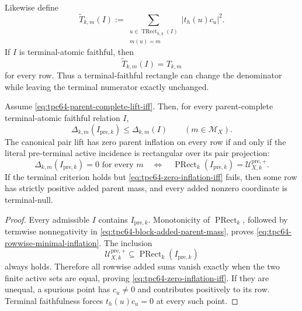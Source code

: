 Likewise define
\begin{equation}
 \widetilde T_{k,m}(I)
 :=
 \sum_{\substack{
 u\in\operatorname{TRect}_{h,k}(I)\\m(u)=m}}
 |t_h(u)c_u|^2.
 \label{eq:tpc64-rectangular-terminal-weight}
\end{equation}
If \(I\) is terminal-atomic faithful, then
\begin{equation}
 \boxed{\widetilde T_{k,m}(I)=T_{k,m}}
 \label{eq:tpc64-block-terminal-preservation}
\end{equation}
for every row.  Thus a terminal-faithful rectangle can change the
denominator while leaving the terminal numerator exactly unchanged.

\begin{theorem}
\label{thm:tpc64-minimal-parent-inflation}
Assume \eqref{eq:tpc64-parent-complete-lift-iff}.  Then, for every
parent-complete terminal-atomic faithful relation \(I\),
\begin{equation}
 \Delta_{k,m}(I_{\mathrm{pre},k})
 \le\Delta_{k,m}(I)
 \qquad(m\in\mathcal M_X).
 \label{eq:tpc64-rowwise-minimal-inflation}
\end{equation}
The canonical pair lift has zero parent inflation on every row if and only
if the literal pre-terminal active incidence is rectangular over its pair
projection:
\begin{equation}
 \boxed{
 \Delta_{k,m}(I_{\mathrm{pre},k})=0
 \text{ for every }m
 \quad\Longleftrightarrow\quad
 \operatorname{PRect}_k(I_{\mathrm{pre},k})
 =\mathcal U_{X,k}^{\mathrm{pre},+}.}
 \label{eq:tpc64-zero-inflation-iff}
\end{equation}
If the terminal criterion holds but
\eqref{eq:tpc64-zero-inflation-iff} fails, then some row has strictly
positive added parent mass, and every added nonzero coordinate is
terminal-null.
\end{theorem}

\begin{proof}
Every admissible \(I\) contains \(I_{\mathrm{pre},k}\).  Monotonicity of
\(\operatorname{PRect}_k\), followed by termwise nonnegativity in
\eqref{eq:tpc64-block-added-parent-mass}, proves
\eqref{eq:tpc64-rowwise-minimal-inflation}.  The inclusion
\[
 \mathcal U_{X,k}^{\mathrm{pre},+}
 \subseteq\operatorname{PRect}_k(I_{\mathrm{pre},k})
\]
always holds.  Therefore all rowwise added sums vanish exactly when the
two finite active sets are equal, proving
\eqref{eq:tpc64-zero-inflation-iff}.  If they are unequal, a spurious
point has \(c_u\ne0\) and contributes positively to its row.  Terminal
faithfulness forces \(t_h(u)c_u=0\) at every such point.
\end{proof}

